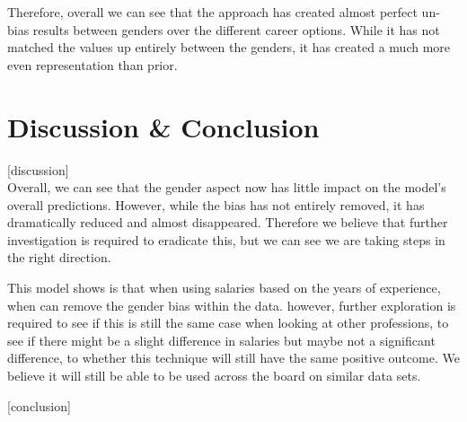 \documentclass{sigchi}
\begin{document}
	Therefore, overall we can see that the approach has created almost perfect un-bias results between genders over the different career options. While it has not matched the values up entirely between the genders, it has created a much more even representation than prior. 


\section{Discussion \& Conclusion}
	[discussion]\\
	Overall, we can see that the gender aspect now has little impact on the model's overall predictions. However, while the bias has not entirely removed, it has dramatically reduced and almost disappeared. Therefore we believe that further investigation is required to eradicate this, but we can see we are taking steps in the right direction.  
	
	This model shows is that when using salaries based on the years of experience, when can remove the gender bias within the data. however, further exploration is required to see if this is still the same case when looking at other professions, to see if there might be a slight difference in salaries but maybe not a significant difference, to whether this technique will still have the same positive outcome. We believe it will still be able to be used across the board on similar data sets.
	
	[conclusion] \\


\newpage
\balance{}


\end{document}
